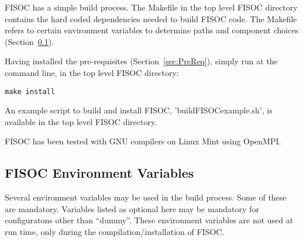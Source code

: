 \documentclass[12pt]{article}
\begin{document}
FISOC has a simple build process.  The Makefile in the top level FISOC directory contains the 
hard coded dependencies needed to build FISOC code.  The Makefile refers to certain 
environment variables to determine paths and component choices (Section~\ref{sec:EnvVars}). 

Having installed the pre-requisites (Section~\ref{sec:PreReq}), simply run at the command line, 
in the top level FISOC directory:
\begin{lstlisting}
make install
\end{lstlisting}

An example script to build and install FISOC, 'buildFISOCexample.sh', is available in the top 
level FISOC directory.

FISOC has been tested with GNU compilers on Linux Mint using OpenMPI. 



\subsection{FISOC Environment Variables}
\label{sec:EnvVars}

Several environment variables may be used in the build process. 
Some of these are mandatory. 
Variables listed as optional here may be mandatory for configuratons other than 
``dummy''.
These environment variables are not used at run time, only during 
the compilation/installation of FISOC.
\end{document}
